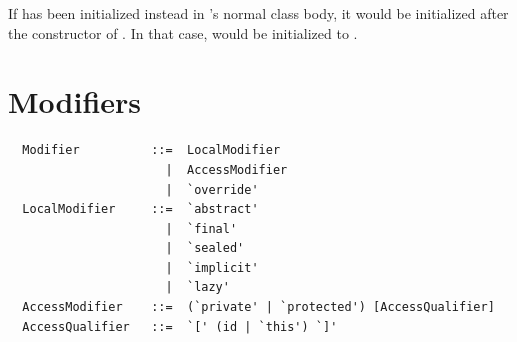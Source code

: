 If  has been initialized instead in 's normal class
body, it would be initialized after the constructor of
. In that case, \lstinline@msg@ would be initialized to
.
  
 
\section{Modifiers}
\label{sec:modifiers}

\syntax\begin{lstlisting}
  Modifier          ::=  LocalModifier 
                      |  AccessModifier
                      |  `override'
  LocalModifier     ::=  `abstract'
                      |  `final'
                      |  `sealed'
                      |  `implicit'
                      |  `lazy'
  AccessModifier    ::=  (`private' | `protected') [AccessQualifier]
  AccessQualifier   ::=  `[' (id | `this') `]'
\end{lstlisting}

